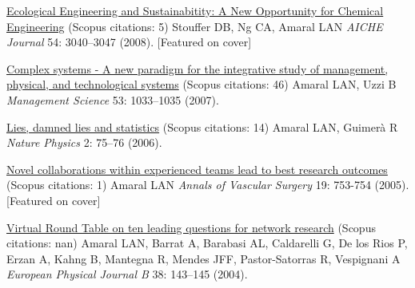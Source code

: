 \NumberedItem{\makebox[0.8cm][r]{[6]}}
\href{/people/amaral/ecological-engineering-and-sustainabitity-a-new-opportunity-for-chemical-engineering}
{Ecological Engineering and Sustainabitity: A New Opportunity for Chemical Engineering}
    (Scopus citations: 5)
\newline
Stouffer DB, Ng CA, Amaral LAN
\newline
\textit{AICHE Journal}
    54:
3040--3047 (2008).
    [Featured on cover]
\newline
\Gap
~
\Gap

\NumberedItem{\makebox[0.8cm][r]{[5]}}
\href{/people/amaral/complex-systems-a-new-paradigm-for-the-integrative-study-of-management-physical-and-technological-systems}
{Complex systems - A new paradigm for the integrative study of management, physical, and technological systems}
    (Scopus citations: 46)
\newline
Amaral LAN, Uzzi B
\newline
\textit{Management Science}
    53:
1033--1035 (2007).
\newline
\Gap
~
\Gap

\NumberedItem{\makebox[0.8cm][r]{[4]}}
\href{/people/amaral/lies-damned-lies-and-statistics}
{Lies, damned lies and statistics}
    (Scopus citations: 14)
\newline
Amaral LAN, Guimer\`a R
\newline
\textit{Nature Physics}
    2:
75--76 (2006).
\newline
\Gap
~
\Gap

\NumberedItem{\makebox[0.8cm][r]{[3]}}
\href{/people/amaral/novel-collaborations-within-experienced-teams-lead-to-best-research-outcomes}
{Novel collaborations within experienced teams lead to best research outcomes}
    (Scopus citations: 1)
\newline
Amaral LAN
\newline
\textit{Annals of Vascular Surgery}
    19:
753-754 (2005).
    [Featured on cover]
\newline
\Gap
~
\Gap

\NumberedItem{\makebox[0.8cm][r]{[2]}}
\href{False}
{Virtual Round Table on ten leading questions for network research}
    (Scopus citations: nan)
\newline
Amaral LAN, Barrat A, Barabasi AL, Caldarelli G, De los Rios P, Erzan A, Kahng B, Mantegna R, Mendes JFF, Pastor-Satorras R, Vespignani A 
\newline
\textit{European Physical Journal B}
    38:
143--145  (2004).
\newline
\Gap
~
\Gap

